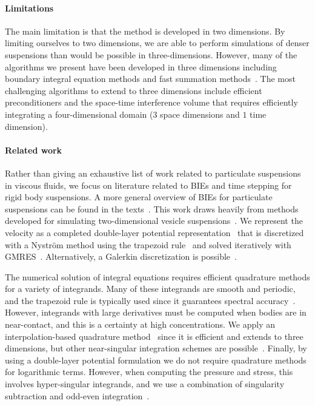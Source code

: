 \documentclass[preprint, 10pt]{elsarticle}
\begin{document}
\paragraph{Limitations} The main limitation is that the method is
developed in two dimensions.  By limiting ourselves to two dimensions,
we are able to perform simulations of denser suspensions  than would be possible in three-dimensions.  However, many of
the algorithms we present have been developed in three dimensions
including boundary integral equation methods and fast summation
methods~\cite{cor-gre-rac-vee2017, kli-tor2014, kli-tor2016}.  The most
challenging algorithms to extend to three dimensions include efficient
preconditioners and the space-time interference volume that requires
efficiently integrating a four-dimensional domain ($3$ space dimensions
and $1$ time dimension).


\paragraph{Related work} Rather than giving an exhaustive list of work
related to particulate suspensions in viscous fluids, we focus on
literature related to BIEs and time stepping for rigid body suspensions.
A more general overview of BIEs for particulate suspensions can be found
in the texts~\cite{Pozrikidis1992, Guazzelli2011, Karrila1991}.  This
work draws heavily from methods developed for simulating two-dimensional
vesicle suspensions~\cite{Quaife2014, Quaife2015, qua-bir2016,
Rahimian2010, Lu2017}.  We represent the velocity as a completed
double-layer potential representation~\cite{Power1987, Power1993,
Karrila1989} that is discretized with a Nystr\"om method using the
trapezoid rule~\cite{Trefethan2014} and solved iteratively with
GMRES~\cite{Saad1986}.  Alternatively, a Galerkin discretization is
possible~\cite{Mammoli1999, Mammoli2002, Mammoli2006}.

The numerical solution of integral equations requires efficient
quadrature methods for a variety of integrands.  Many of these
integrands are smooth and periodic, and the trapezoid rule is typically
used since it guarantees spectral accuracy~\cite{Trefethan2014}.
However, integrands with large derivatives must be computed when bodies
are in near-contact, and this is a certainty at high concentrations.  We
apply an interpolation-based quadrature method~\cite{Ying2006,
Quaife2014} since it is efficient and extends to three dimensions, but
other near-singular integration schemes are possible~\cite{Klockner2013,
Barnett2015, Beale2016, Helsing2008, Kropinski1999, Mammoli2006,
Siegel2018}.  Finally, by using a double-layer potential formulation we
do not require quadrature methods for logarithmic terms.  However, when
computing the pressure and stress, this involves hyper-singular
integrands, and we use a combination of singularity subtraction and
odd-even integration~\cite{sid-isr1988, Quaife2014}.
\end{document}
